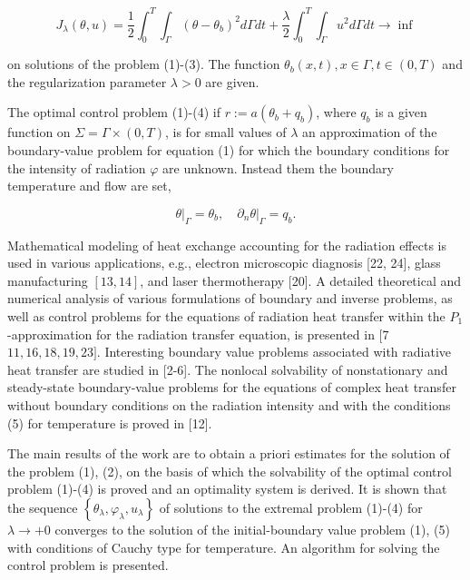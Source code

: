 $$
J_{\lambda}(\theta, u)=\frac{1}{2} \int_{0}^{T} \int_{\Gamma}\left(\theta-\theta_{b}\right)^{2} d \Gamma d t+\frac{\lambda}{2} \int_{0}^{T} \int_{\Gamma} u^{2} d \Gamma d t \rightarrow \inf
$$

on solutions of the problem (1)-(3). The function $\theta_{b}(x, t), x \in \Gamma, t \in(0, T)$ and the regularization parameter $\lambda>0$ are given.

The optimal control problem (1)-(4) if $r:=a\left(\theta_{b}+q_{b}\right)$, where $q_{b}$ is a given function on $\Sigma=\Gamma \times(0, T)$, is for small values of $\lambda$ an approximation of the boundary-value problem for equation (1) for which the boundary conditions for the intensity of radiation $\varphi$ are unknown. Instead them the boundary temperature and flow are set,

$$
\left.\theta\right|_{\Gamma}=\theta_{b},\left.\quad \partial_{n} \theta\right|_{\Gamma}=q_{b} .
$$

Mathematical modeling of heat exchange accounting for the radiation effects is used in various applications, e.g., electron microscopic diagnosis [22, 24], glass manufacturing $[13,14]$, and laser thermotherapy [20]. A detailed theoretical and numerical analysis of various formulations of boundary and inverse problems, as well as control problems for the equations of radiation heat transfer within the $P_{1}$-approximation for the radiation transfer equation, is presented in [7$11,16,18,19,23]$. Interesting boundary value problems associated with radiative heat transfer are studied in [2-6]. The nonlocal solvability of nonstationary and steady-state boundary-value problems for the equations of complex heat transfer without boundary conditions on the radiation intensity and with the conditions (5) for temperature is proved in [12].

The main results of the work are to obtain a priori estimates for the solution of the problem (1), (2), on the basis of which the solvability of the optimal control problem (1)-(4) is proved and an optimality system is derived. It is shown that the sequence $\left\{\theta_{\lambda}, \varphi_{\lambda}, u_{\lambda}\right\}$ of solutions to the extremal problem (1)-(4) for $\lambda \rightarrow+0$ converges to the solution of the initial-boundary value problem (1), (5) with conditions of Cauchy type for temperature. An algorithm for solving the control problem is presented.

